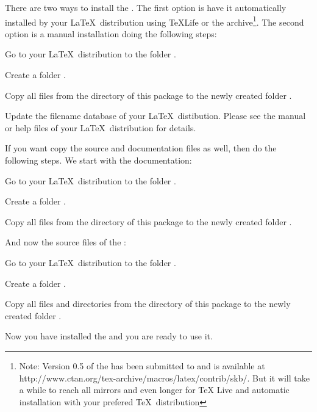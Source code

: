
There are two ways to install the . The first option is have it 
automatically installed by your \LaTeX~distribution using \TeX Life 
or the  archive\footnote{Note: Version 0.5 of the  has been submitted
to  and is available at http://www.ctan.org/tex-archive/macros/latex/contrib/skb/.
But it will take a while to reach all mirrors and even longer for TeX Live and 
automatic installation with your prefered \TeX~distribution}. The second option
is a manual installation doing the following steps:
\begin{skbnoteenum}
  \item Go to your \LaTeX~distribution to the folder .
  \item Create a folder .
  \item Copy all files from the directory  of this package to the 
        newly created folder .
  \item Update the filename database of your \LaTeX~distibution. Please see the 
        manual or help files of your \LaTeX~distribution for details.
\end{skbnoteenum}

\noindent If you want copy the source and documentation files as well, then do the 
following steps. We start with the documentation:
\begin{skbnoteenum}
  \item Go to your \LaTeX~distribution to the folder .
  \item Create a folder .
  \item Copy all files from the directory  of this package to the 
        newly created folder .
\end{skbnoteenum}

\noindent And now the source files of the :
\begin{skbnoteenum}
  \item Go to your \LaTeX~distribution to the folder .
  \item Create a folder .
  \item Copy all files and directories from the directory  of this package to the 
        newly created folder .
\end{skbnoteenum}

Now you have installed the  and you are ready to use it.